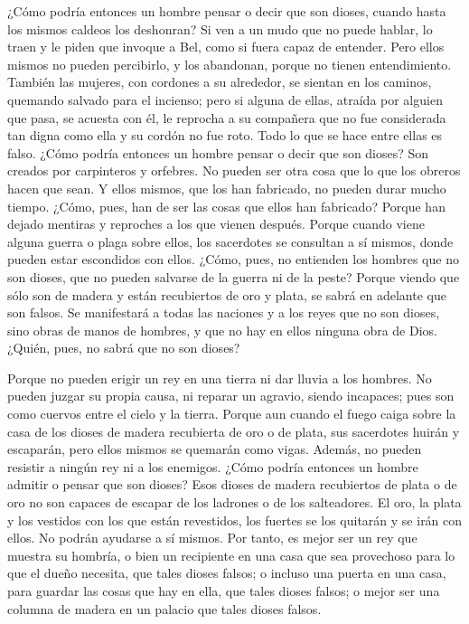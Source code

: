  ¿Cómo podría entonces un hombre pensar o decir que son
dioses, cuando hasta los mismos caldeos los deshonran? 
Si ven a un mudo que no puede hablar, lo traen y le piden que invoque a
Bel, como si fuera capaz de entender.  Pero ellos mismos
no pueden percibirlo, y los abandonan, porque no tienen entendimiento.
 También las mujeres, con cordones a su alrededor, se
sientan en los caminos, quemando salvado para el incienso; pero si
alguna de ellas, atraída por alguien que pasa, se acuesta con él, le
reprocha a su compañera que no fue considerada tan digna como ella y su
cordón no fue roto.  Todo lo que se hace entre ellas es
falso. ¿Cómo podría entonces un hombre pensar o decir que son dioses?
 Son creados por carpinteros y orfebres. No pueden ser
otra cosa que lo que los obreros hacen que sean.  Y ellos
mismos, que los han fabricado, no pueden durar mucho tiempo. ¿Cómo,
pues, han de ser las cosas que ellos han fabricado? 
Porque han dejado mentiras y reproches a los que vienen después.
 Porque cuando viene alguna guerra o plaga sobre ellos,
los sacerdotes se consultan a sí mismos, donde pueden estar escondidos
con ellos.  ¿Cómo, pues, no entienden los hombres que no
son dioses, que no pueden salvarse de la guerra ni de la peste?
 Porque viendo que sólo son de madera y están recubiertos
de oro y plata, se sabrá en adelante que son falsos.  Se
manifestará a todas las naciones y a los reyes que no son dioses, sino
obras de manos de hombres, y que no hay en ellos ninguna obra de Dios.
 ¿Quién, pues, no sabrá que no son dioses?

 Porque no pueden erigir un rey en una tierra ni dar
lluvia a los hombres.  No pueden juzgar su propia causa,
ni reparar un agravio, siendo incapaces; pues son como cuervos entre el
cielo y la tierra.  Porque aun cuando el fuego caiga
sobre la casa de los dioses de madera recubierta de oro o de plata, sus
sacerdotes huirán y escaparán, pero ellos mismos se quemarán como vigas.
 Además, no pueden resistir a ningún rey ni a los
enemigos. ¿Cómo podría entonces un hombre admitir o pensar que son
dioses?  Esos dioses de madera recubiertos de plata o de
oro no son capaces de escapar de los ladrones o de los salteadores.
 El oro, la plata y los vestidos con los que están
revestidos, los fuertes se los quitarán y se irán con ellos. No podrán
ayudarse a sí mismos.  Por tanto, es mejor ser un rey que
muestra su hombría, o bien un recipiente en una casa que sea provechoso
para lo que el dueño necesita, que tales dioses falsos; o incluso una
puerta en una casa, para guardar las cosas que hay en ella, que tales
dioses falsos; o mejor ser una columna de madera en un palacio que tales
dioses falsos.

